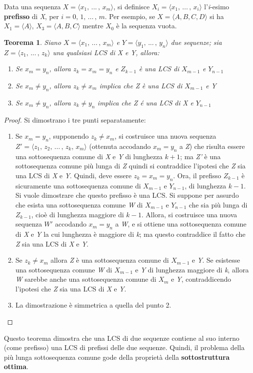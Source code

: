 \documentclass[10pt, a4paper]{report}
\newtheorem{theorem}{Teorema}[chapter]
\begin{document}
Data una sequenza $X = \langle x_1,\,...\,,\,x_m \rangle$, si definisce $X_i = \langle x_1,\,...\,,\,x_i \rangle$ l'\textit{i}-esimo \textbf{prefisso} di \textit{X}, per $i = 0,\,1,\,...\,,\,m$. Per esempio, se $X = \langle A, B, C, D\rangle$ si ha $X_1 = \langle A\rangle$, $X_3 = \langle A, B, C\rangle$ mentre $X_0$ è la sequenza vuota.
\begin{theorem}
Siano $X = \langle x_1,\,...\,,\,x_m \rangle$ e $Y = \langle y_1,\,...\,,\,y_n\rangle$ due sequenze; sia $Z = \langle z_1,\,...\,,\,z_k\rangle$ una qualsiasi LCS di \textit{X} e \textit{Y}, allora:
\begin{enumerate}
\item Se $x_m = y_n$, allora $z_k = x_m = y_n$ e $Z_{k-1}$ è una LCS di $X_{m-1}$ e $Y_{n-1}$
\item Se $x_m \neq y_n$, allora $z_k \neq x_m$ implica che \textit{Z} è una LCS di  $X_{m-1}$ e \textit{Y}
\item Se $x_m \neq y_n$, allora $z_k \not= y_n$ implica che \textit{Z} é una LCS di \textit{X} e $Y_{n-1}$
\end{enumerate}
\end{theorem}
\begin{proof}
Si dimostrano i tre punti separatamente:
\begin{enumerate}
\item Se $x_m = y_n$, supponendo $z_k \neq x_m$, si costruisce una nuova sequenza $Z' = \langle z_1,\,z_2,\,...\,,\,z_k,\,x_m\rangle$ (ottenuta accodando $x_m = y_n$ a \textit{Z}) che risulta essere una sottosequenza comune di \textit{X} e \textit{Y} di lunghezza $k + 1$; ma \textit{Z'} è una sottosequenza comune più lunga di \textit{Z} quindi si contraddice l'ipotesi che \textit{Z} sia una LCS di \textit{X} e \textit{Y}. Quindi, deve essere $z_k = x_m = y_n$. Ora, il prefisso $Z_{k-1}$ è sicuramente una sottosequenza comune di $X_{m-1}$ e $Y_{n-1}$, di lunghezza $k - 1$. Si vuole dimostrare che questo prefisso è una LCS. Si suppone per assurdo che esista una sottosequenza comune \textit{W} di $X_{m-1}$ e $Y_{n-1}$ che sia più lunga di $Z_{k-1}$, cioè di lunghezza maggiore di $k - 1$. Allora, si costruisce una nuova sequenza $W'$ accodando $x_m = y_n$ a \textit{W}, e si ottiene una sottosequenza comune di \textit{X} e \textit{Y} la cui lunghezza è maggiore di \textit{k}; ma questo contraddice il fatto che \textit{Z} sia una LCS di \textit{X} e \textit{Y}. 
\item Se $z_k \neq x_m$ allora \textit{Z} è una sottosequenza comune di $X_{m-1}$ e \textit{Y}. Se esistesse una sottosequenza comune \textit{W} di $X_{m-1}$ e \textit{Y} di lunghezza maggiore di \textit{k}, allora \textit{W} sarebbe anche una sottosequenza comune di $X_m$ e \textit{Y}, contraddicendo l'ipotesi che \textit{Z} sia una LCS di \textit{X} e \textit{Y}.
\item La dimostrazione è simmetrica a quella del punto 2.
\end{enumerate}
\end{proof}
Questo teorema dimostra che una LCS di due sequenze contiene al suo interno (come prefisso) una LCS di prefissi delle due sequenze. Quindi, il problema della più lunga sottosequenza comune gode della proprietà della \textbf{sottostruttura ottima}.
\end{document}
